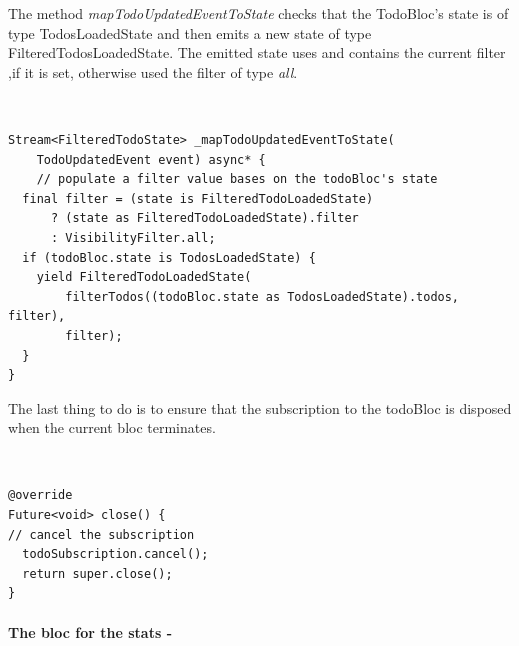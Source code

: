 The method \textit{mapTodoUpdatedEventToState} checks that the TodoBloc’s state is of type TodosLoadedState and then emits a new state of type FilteredTodosLoadedState. The emitted state uses and contains the current filter ,if it is set, otherwise used the filter of type \textit{all}.
\begin{code}
\mbox{}\\
 \mbox{}
\label{code:2.14}
\begin{verbatim}
Stream<FilteredTodoState> _mapTodoUpdatedEventToState(
    TodoUpdatedEvent event) async* {
    // populate a filter value bases on the todoBloc's state
  final filter = (state is FilteredTodoLoadedState)
      ? (state as FilteredTodoLoadedState).filter
      : VisibilityFilter.all;
  if (todoBloc.state is TodosLoadedState) {
    yield FilteredTodoLoadedState(
        filterTodos((todoBloc.state as TodosLoadedState).todos, filter),
        filter);
  }
}
\end{verbatim}
\mbox{}
\end{code}

The last thing to do is to ensure that the subscription to the todoBloc is disposed when the current bloc terminates.
\begin{code}
\mbox{}\\
 \mbox{}
\label{code:2.14}
\begin{verbatim}
@override
Future<void> close() {
// cancel the subscription
  todoSubscription.cancel();
  return super.close();
}
\end{verbatim}
\mbox{}
\end{code}


\paragraph{The bloc for the stats - }
\label{subpar:todo_app_bloc_core_state}

